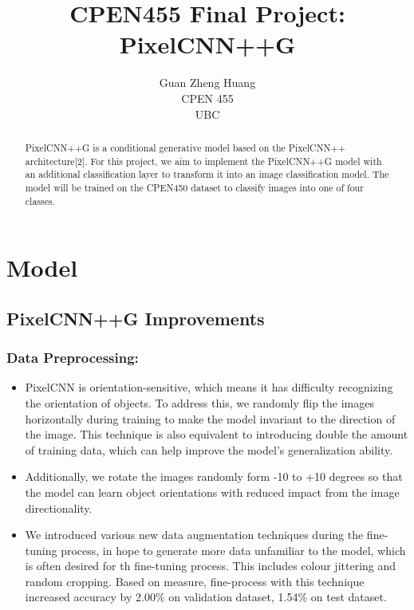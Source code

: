 \documentclass{article}
\title{CPEN455 Final Project: PixelCNN++G}
\author{
  Guan Zheng Huang \\
  CPEN 455\\
  UBC\\
}
\begin{document}
\pagestyle{fancy}
\fancyhead{} 

\maketitle
\thispagestyle{fancy}

\begin{abstract}
    PixelCNN++G is a conditional generative model based on the PixelCNN++ architecture[2]. For this project, we aim to implement the PixelCNN++G model with an additional classification layer to transform it into an image classification model. The model will be trained on the CPEN450 dataset to classify images into one of four classes.
  \end{abstract}

\section{Model}

\subsection{PixelCNN++G Improvements}

    \subsubsection{Data Preprocessing:}
    \begin{itemize}
        \item PixelCNN is orientation-sensitive, which means it has difficulty recognizing the orientation of objects. To address this, we randomly flip the images horizontally during training to make the model invariant to the direction of the image. This technique is also equivalent to introducing double the amount of training data, which can help improve the model's generalization ability.
        \item Additionally, we rotate the images randomly form -10 to +10 degrees so that the model can learn object orientations with reduced impact from the image directionality.
        \item We introduced various new data augmentation techniques during the fine-tuning process, in hope to generate more data unfamiliar to the model, which is often desired for th fine-tuning process. This includes colour jittering and random cropping. Based on measure, fine-process with this technique increased accuracy by 2.00\% on validation dataset, 1.54\% on test dataset.
    \end{itemize}
\end{document}
